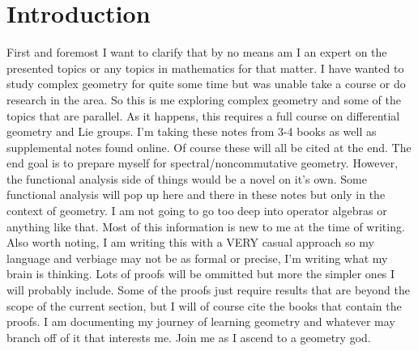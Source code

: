 \thispagestyle{empty}
\section*{Introduction}
First and foremost I want to clarify that by no means am I an expert on the presented
topics or any topics in mathematics for that matter. I have wanted to study complex
geometry for quite some time but was unable take a course or do research in the area.
So this is me exploring complex geometry and some of the topics that are parallel.
As it happens, this requires a full course on differential geometry and Lie groups.
I'm taking these notes from 3-4 books as well as supplemental notes found online.
Of course these will all be cited at the end. The end goal is to prepare myself for
spectral/noncommutative geometry. However, the functional analysis side of things
would be a novel on it's own. Some functional analysis will pop up here and there
in these notes but only in the context of geometry. I am not going to go too deep
into operator algebras or anything like that. Most of this information is new to
me at the time of writing. Also worth noting, I am writing this with a VERY casual
approach so my language and verbiage may not be as formal or precise, I'm writing
what my brain is thinking. Lots of proofs will be ommitted but more the simpler ones
I will probably include. Some of the proofs just require results that are beyond
the scope of the current section, but I will of course cite the books that contain
the proofs. I am documenting my journey of learning geometry and whatever may branch
off of it that interests me. Join me as I ascend to a geometry god.
